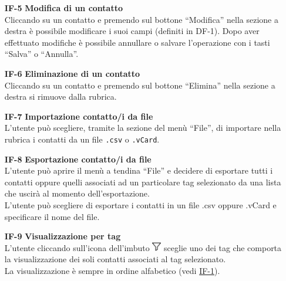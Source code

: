 \begin{tcolorbox}[breakable, colback=white,colframe=black!80!white,title=\textbf{Funzionalità individuali IF}]
\begin{itemize}[itemsep=2pt, topsep=0pt]
		\item[\textbf{IF-5}] \textbf{Modifica di un contatto}
		\\Cliccando su un contatto e premendo sul bottone “Modifica” nella sezione a destra è possibile modificare i suoi campi (definiti in DF-1). Dopo aver effettuato modifiche è possibile annullare o salvare l’operazione con i tasti “Salva” o “Annulla”.
		
		\item[\textbf{IF-6}] \textbf{Eliminazione di un contatto}
		\\Cliccando su un contatto e premendo sul bottone “Elimina” nella sezione a destra si rimuove dalla rubrica.
		
		\item[\textbf{IF-7}] \textbf{Importazione contatto/i da file}
		\\L’utente può scegliere, tramite la sezione del menù “File”, di importare nella rubrica i contatti da un file \texttt{.csv} o \texttt{.vCard}.
	
		\item[\textbf{IF-8}] \textbf{Esportazione contatto/i da file}
		\\L’utente può aprire il menù a tendina “File” e decidere di esportare 
		tutti i contatti oppure quelli associati ad un particolare tag selezionato 
		da una lista che uscirà al momento dell’esportazione.
		\\L’utente può scegliere di esportare i contatti in un file .csv oppure 
		.vCard e specificare il nome del file. 
		
		\item[\textbf{IF-9}] \textbf{Visualizzazione per tag}
		\\L’utente cliccando sull’icona dell’imbuto \includegraphics[height=0.4cm]{images/imbuto_icona.jpeg} sceglie uno dei tag che comporta la visualizzazione dei soli contatti associati al tag selezionato.
		\\La visualizzazione è sempre in ordine alfabetico (vedi \hyperlink{IF-1}{IF-1}).
		
	\end{itemize}
\end{tcolorbox}

